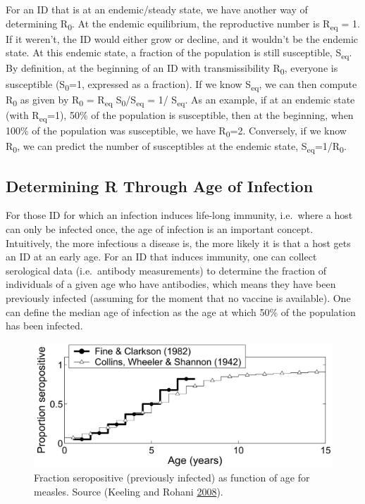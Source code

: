 \documentclass[]{book}
\theoremstyle{definition}
\theoremstyle{definition}
\theoremstyle{definition}
\theoremstyle{remark}
\begin{document}
For an ID that is at an endemic/steady state, we have another way of
determining R\textsubscript{0}. At the endemic equilibrium, the
reproductive number is R\textsubscript{eq} = 1. If it weren't, the ID
would either grow or decline, and it wouldn't be the endemic state. At
this endemic state, a fraction of the population is still susceptible,
S\textsubscript{eq}. By definition, at the beginning of an ID with
transmissibility R\textsubscript{0}, everyone is susceptible
(S\textsubscript{0}=1, expressed as a fraction). If we know
S\textsubscript{eq}, we can then compute R\textsubscript{0} as given by
R\textsubscript{0} = R\textsubscript{eq}
S\textsubscript{0}/S\textsubscript{eq} = 1/ S\textsubscript{eq}. As an
example, if at an endemic state (with R\textsubscript{eq}=1), 50\% of
the population is susceptible, then at the beginning, when 100\% of the
population was susceptible, we have R\textsubscript{0}=2. Conversely, if
we know R\textsubscript{0}, we can predict the number of susceptibles at
the endemic state, S\textsubscript{eq}=1/R\textsubscript{0}.

\hypertarget{determining-r-through-age-of-infection}{%
\subsection{Determining R Through Age of
Infection}\label{determining-r-through-age-of-infection}}

For those ID for which an infection induces life-long immunity,
i.e.~where a host can only be infected once, the age of infection is an
important concept. Intuitively, the more infectious a disease is, the
more likely it is that a host gets an ID at an early age. For an ID that
induces immunity, one can collect serological data (i.e.~antibody
measurements) to determine the fraction of individuals of a given age
who have antibodies, which means they have been previously infected
(assuming for the moment that no vaccine is available). One can define
the median age of infection as the age at which 50\% of the population
has been infected.

\begin{figure}
\centering
\includegraphics{./images/R0age.png}
\caption{\label{fig:R0age}Fraction seropositive (previously infected) as
function of age for measles. Source (Keeling and Rohani
\protect\hyperlink{ref-keeling08}{2008}).}
\end{figure}
\end{document}

